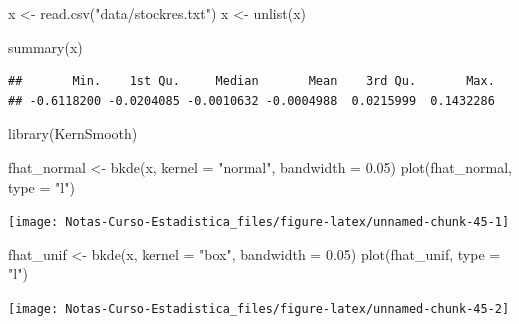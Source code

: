 \documentclass[
  12pt,
]{book}
\newenvironment{Shaded}{\begin{snugshade}}{\end{snugshade}}
\newcommand{\AttributeTok}[1]{\textcolor[rgb]{0.77,0.63,0.00}{#1}}
\newcommand{\FloatTok}[1]{\textcolor[rgb]{0.00,0.00,0.81}{#1}}
\newcommand{\FunctionTok}[1]{\textcolor[rgb]{0.00,0.00,0.00}{#1}}
\newcommand{\NormalTok}[1]{#1}
\newcommand{\OtherTok}[1]{\textcolor[rgb]{0.56,0.35,0.01}{#1}}
\newcommand{\StringTok}[1]{\textcolor[rgb]{0.31,0.60,0.02}{#1}}
\theoremstyle{definition}
\theoremstyle{definition}
\theoremstyle{definition}
\theoremstyle{definition}
\theoremstyle{remark}
\begin{document}
\begin{Shaded}
\begin{Highlighting}[]
\NormalTok{x }\OtherTok{\textless{}{-}} \FunctionTok{read.csv}\NormalTok{(}\StringTok{"data/stockres.txt"}\NormalTok{)}
\NormalTok{x }\OtherTok{\textless{}{-}} \FunctionTok{unlist}\NormalTok{(x)}
\end{Highlighting}
\end{Shaded}

\begin{Shaded}
\begin{Highlighting}[]
\FunctionTok{summary}\NormalTok{(x)}
\end{Highlighting}
\end{Shaded}

\begin{verbatim}
##       Min.    1st Qu.     Median       Mean    3rd Qu.       Max. 
## -0.6118200 -0.0204085 -0.0010632 -0.0004988  0.0215999  0.1432286
\end{verbatim}

\begin{Shaded}
\begin{Highlighting}[]
\FunctionTok{library}\NormalTok{(KernSmooth)}

\NormalTok{fhat\_normal }\OtherTok{\textless{}{-}} \FunctionTok{bkde}\NormalTok{(x, }\AttributeTok{kernel =} \StringTok{"normal"}\NormalTok{, }\AttributeTok{bandwidth =} \FloatTok{0.05}\NormalTok{)}
\FunctionTok{plot}\NormalTok{(fhat\_normal, }\AttributeTok{type =} \StringTok{"l"}\NormalTok{)}
\end{Highlighting}
\end{Shaded}

\begin{center}\texttt{[image: Notas-Curso-Estadistica\_files/figure-latex/unnamed-chunk-45-1]} \end{center}

\begin{Shaded}
\begin{Highlighting}[]
\NormalTok{fhat\_unif }\OtherTok{\textless{}{-}} \FunctionTok{bkde}\NormalTok{(x, }\AttributeTok{kernel =} \StringTok{"box"}\NormalTok{, }\AttributeTok{bandwidth =} \FloatTok{0.05}\NormalTok{)}
\FunctionTok{plot}\NormalTok{(fhat\_unif, }\AttributeTok{type =} \StringTok{"l"}\NormalTok{)}
\end{Highlighting}
\end{Shaded}

\begin{center}\texttt{[image: Notas-Curso-Estadistica\_files/figure-latex/unnamed-chunk-45-2]} \end{center}
\end{document}
